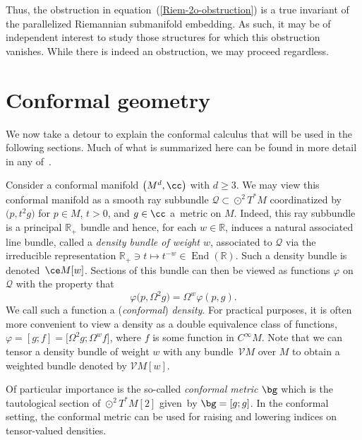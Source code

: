 Thus, the obstruction in equation~(\ref{Riem-2o-obstruction}) is a true invariant of the parallelized Riemannian submanifold embedding. As such, it may be of independent interest to study those structures for which this obstruction vanishes. While there is indeed an obstruction, we may proceed regardless.




\section{Conformal geometry}\label{conf-geom-sec}
We now take a detour to explain the conformal calculus that will be used in the following sections. Much of what is summarized here can be found in more detail in any of~\cite{BEG,CapGover1999,CapGover2003,GOpet,GW}.

Consider a conformal manifold $\bigl(M^d,\cc\bigr)$ with $d \geq 3$. We may view this conformal manifold as a smooth ray subbundle $\mathcal{Q} \subset \odot^2 T^* M$ coordinatized by $\bigl(p,t^2 g\bigr)$ for $p \in M$, $t > 0$, and $g \in \cc$ a~metric on $M$. Indeed, this ray subbundle is a principal $\mathbb{R}_+$ bundle and hence, for each $w \in \mathbb{R}$, induces a natural associated line bundle, called a \textit{density bundle of weight $w$}, associated to $\mathcal{Q}$ via the irreducible representation $\mathbb{R}_+ \ni t \mapsto t^{-w} \in \operatorname{End}(\mathbb{R})$. Such a density bundle is denoted~$\ce M[w]$. Sections of this bundle can then be viewed as functions $\varphi$ on $\mathcal{Q}$ with the property that
\[\varphi\bigl(p, \Omega^2 g\bigr) = \Omega^w \varphi(p,g) .\]
We call such a function a (\textit{conformal}) \textit{density}. For practical purposes, it is often more convenient to view a density as a double equivalence class of functions, $\varphi = [g;f] = \bigl[\Omega^2 g; \Omega^w f\bigr]$, where $f$ is some function in $C^\infty M$. Note that we can tensor a density bundle of weight $w$ with any bundle~$\mathcal{V} M$ over $M$ to obtain a weighted bundle denoted by $\mathcal{V} M[w]$.

Of particular importance is the so-called \textit{conformal metric} $\bg$ which is the tautological section of $\odot^2 T^* M[2]$ given~by $\bg = [g;g]$. In the conformal setting, the conformal metric can be used for raising and lowering indices on tensor-valued densities.

